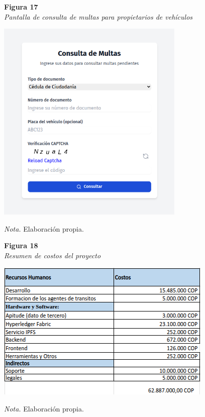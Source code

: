 \begin{figure}[htbp]
    \begin{flushleft}
        \textbf{Figura 17}\\
        \textit{Pantalla de consulta de multas para propietarios de vehículos}
    \end{flushleft}
    \centering
    \includegraphics[width=0.8\textwidth]{Images/UI5.png}
    \vspace{0.5em}
    \begin{flushleft}
        \textit{Nota.} Elaboración propia.
    \end{flushleft}
    \label{fig:consulta_multas_propietario}
\end{figure}

\begin{figure}[htbp]
    \begin{flushleft}
        \textbf{Figura 18}\\
        \textit{Resumen de costos del proyecto}
    \end{flushleft}
    \centering
    \includegraphics[width=\textwidth]{Images/costos1.png}
    \vspace{0.5em}
    \begin{flushleft}
        \textit{Nota.} Elaboración propia.
    \end{flushleft}
    \label{fig:costos1}
\end{figure}

